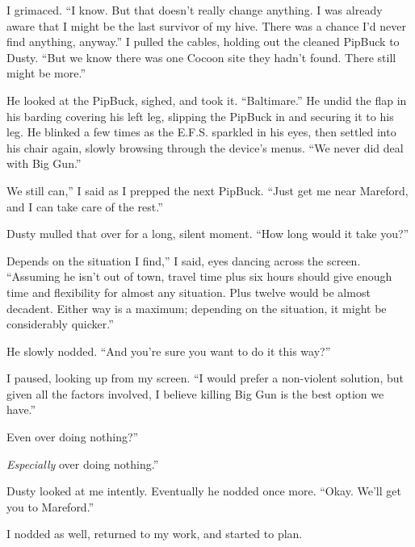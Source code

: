 I grimaced. “I know. But that doesn’t really change anything. I was already aware that I might be the last survivor of my hive. There was a chance I’d never find anything, anyway.” I pulled the cables, holding out the cleaned PipBuck to Dusty. “But we know there was one Cocoon site they hadn’t found. There still might be more.”

He looked at the PipBuck, sighed, and took it. “Baltimare.” He undid the flap in his barding covering his left leg, slipping the PipBuck in and securing it to his leg. He blinked a few times as the E.F.S. sparkled in his eyes, then settled into his chair again, slowly browsing through the device’s menus. “We never did deal with Big Gun.”

\leavevmode{}We still can,” I said as I prepped the next PipBuck. “Just get me near Mareford, and I can take care of the rest.”

Dusty mulled that over for a long, silent moment. “How long would it take you?”

\leavevmode{}Depends on the situation I find,” I said, eyes dancing across the screen. “Assuming he isn’t out of town, travel time plus six hours should give enough time and flexibility for almost any situation. Plus twelve would be almost decadent. Either way is a maximum; depending on the situation, it might be considerably quicker.”

He slowly nodded. “And you’re sure you want to do it this way?”

I paused, looking up from my screen. “I would prefer a non-violent solution, but given all the factors involved, I believe killing Big Gun is the best option we have.”

\leavevmode{}Even over doing nothing?”

\leavevmode{}\textit{Especially} over doing nothing.”

Dusty looked at me intently. Eventually he nodded once more. “Okay. We’ll get you to Mareford.”

I nodded as well, returned to my work, and started to plan.